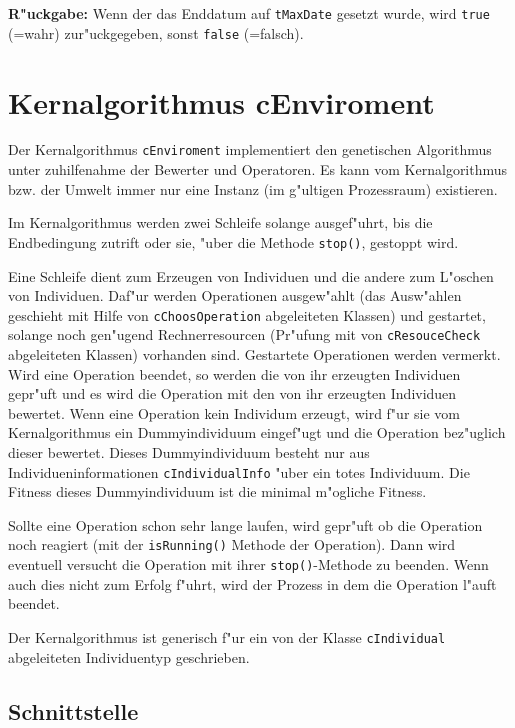 \bigskip\noindent
\textbf{R"uckgabe:} Wenn der das Enddatum auf \verb|tMaxDate| gesetzt wurde, wird \verb|true| (=wahr) zur"uckgegeben, sonst \verb|false| (=falsch).


\section{Kernalgorithmus cEnviroment}
\label{secCEnviroment}

Der Kernalgorithmus \verb|cEnviroment| implementiert den genetischen Algorithmus unter zuhilfenahme der Bewerter und Operatoren. Es kann vom Kernalgorithmus bzw. der Umwelt immer nur eine Instanz (im g"ultigen Prozessraum) existieren.

Im Kernalgorithmus werden zwei Schleife solange ausgef"uhrt, bis die Endbedingung zutrift oder sie, "uber die Methode \verb|stop()|, gestoppt wird.

Eine Schleife dient zum Erzeugen von Individuen und die andere zum L"oschen von Individuen. Daf"ur werden Operationen ausgew"ahlt (das Ausw"ahlen geschieht mit Hilfe von \verb|cChoosOperation| abgeleiteten Klassen) und gestartet, solange noch gen"ugend Rechnerresourcen (Pr"ufung mit von \verb|cResouceCheck| abgeleiteten Klassen) vorhanden sind. Gestartete Operationen werden vermerkt. Wird eine Operation beendet, so werden die von ihr erzeugten Individuen gepr"uft und es wird die Operation mit den von ihr erzeugten Individuen bewertet.
Wenn eine Operation kein Individum erzeugt, wird f"ur sie vom Kernalgorithmus ein Dummyindividuum eingef"ugt und die Operation bez"uglich dieser bewertet. Dieses Dummyindividuum besteht nur aus Individueninformationen \verb|cIndividualInfo| "uber ein totes Individuum. Die Fitness dieses Dummyindividuum ist die minimal m"ogliche Fitness.

Sollte eine Operation schon sehr lange laufen, wird gepr"uft ob die Operation noch reagiert (mit der \verb|isRunning()| Methode der Operation). Dann wird eventuell versucht die Operation mit ihrer \verb|stop()|-Methode zu beenden. Wenn auch dies nicht zum Erfolg f"uhrt, wird der Prozess in dem die Operation l"auft beendet.

Der Kernalgorithmus ist generisch f"ur ein von der Klasse \verb|cIndividual| abgeleiteten Individuentyp geschrieben.


\subsection{Schnittstelle}



